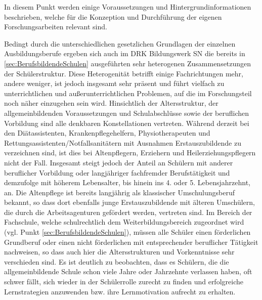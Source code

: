 In diesem Punkt werden einige Voraussetzungen und Hintergrundinformationen beschrieben, welche für die Konzeption und Durchführung der eigenen Forschungsarbeiten relevant sind. 

Bedingt durch die unterschiedlichen gesetzlichen Grundlagen der einzelnen Ausbildungsberufe ergeben sich auch im DRK Bildungswerk SN die bereits in \ref{sec:BerufsbildendeSchulen} ausgeführten sehr heterogenen Zusammensetzungen der Schülerstruktur. Diese Heterogenität betrifft einige Fachrichtungen mehr, andere weniger, ist jedoch insgesamt sehr präsent und führt vielfach zu unterrichtlichen und außerunterrichtlichen Problemen, auf die im Forschungsteil noch näher einzugehen sein wird. Hinsichtlich der Altersstruktur, der allgemeinbildenden Voraussetzungen und Schulabschlüsse sowie der beruflichen Vorbildung sind alle denkbaren Konstellationen vertreten. Während derzeit bei den Diätassistenten, Krankenpflegehelfern, Physiotherapeuten und Rettungsassistenten/Notfallsanitätern mit Ausnahmen Erstauszubildende zu verzeichnen sind, ist dies bei Altenpflegern, Erziehern und Heilerziehungspflegern nicht der Fall. Insgesamt steigt jedoch der Anteil an Schülern mit anderer beruflicher Vorbildung oder langjähriger fachfremder Berufstätigkeit und demzufolge mit höherem Lebensalter, bis hinein ins 4. oder 5. Lebensjahrzehnt, an. Die Altenpflege ist bereits langjährig als klassischer Umschulungsberuf bekannt, so dass dort ebenfalls junge Erstauszubildende mit älteren Umschülern, die durch die Arbeitsagenturen gefördert werden, vertreten sind. Im Bereich der Fachschule, welche schulrechtlich dem Weiterbildungsbereich zugeordnet wird (vgl. Punkt \ref{sec:BerufsbildendeSchulen}), müssen alle Schüler einen förderlichen Grundberuf oder einen nicht förderlichen mit entsprechender beruflicher Tätigkeit nachweisen, so dass auch hier die Altersstrukturen und Vorkenntnisse sehr verschieden sind. Es ist deutlich zu beobachten, dass es Schülern, die die allgemeinbildende Schule schon viele Jahre oder Jahrzehnte verlassen haben, oft schwer fällt, sich wieder in der Schülerrolle zurecht zu finden und erfolgreiche Lernstrategien anzuwenden bzw. ihre Lernmotivation aufrecht zu erhalten.

